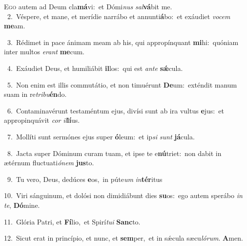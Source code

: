 \lettrine{\initial\textcolor{\initialcolor}{E}}{go} autem ad Deum cla\-\textbf{má}\-vi:~\star et Dómi\textit{nus} \textit{sal}\-\textbf{vá}bit me.\\
{\numbfont\textcolor{\numbcolor}{~2.}}~Véspere, et mane, et merídie narrábo et annunti\-\textbf{á}\-bo:~\star et exáudiet \textit{vo}\-\textit{cem} \textbf{me}\-am.\par
{\numbfont\textcolor{\numbcolor}{~3.}}~Rédimet in pace ánimam meam ab his, qui appropínquant \textbf{mi}\-hi:~\star quóniam inter multos \textit{e}\-\textit{rant} \textbf{me}\-cum.\par
{\numbfont\textcolor{\numbcolor}{~4.}}~Exáudiet Deus, et humiliábit \textbf{il}\-los:~\star qui est \textit{an}\-\textit{te} \textbf{sǽ}\-cula.\par
{\numbfont\textcolor{\numbcolor}{~5.}}~Non enim est illis commutátio, et non timuérunt \textbf{De}\-um:~\star exténdit manum suam in re\-\textit{tri}\-\textit{bu}\textbf{én}do.\par
{\numbfont\textcolor{\numbcolor}{~6.}}~Contaminavérunt testaméntum ejus, divísi sunt ab ira vultus \textbf{e}\-jus:~\star et appropinquávit \textit{cor} \textit{il}\-\textbf{lí}us.\par
{\numbfont\textcolor{\numbcolor}{~7.}}~Mollíti sunt sermónes ejus super \textbf{ó}\-leum:~\star et ip\textit{si} \textit{sunt} \textbf{já}\-cula.\par
{\numbfont\textcolor{\numbcolor}{~8.}}~Jacta super Dóminum curam tuam, et ipse te e\-\textbf{nú}\-triet:~\star non dabit in ætérnum fluctuati\-\textit{ó}\-\textit{nem} \textbf{jus}\-to.\par
{\numbfont\textcolor{\numbcolor}{~9.}}~Tu vero, Deus, dedúces \textbf{e}\-os,~\star in púte\textit{um} \textit{in}\-\textbf{tér}itus\par
{\numbfont\textcolor{\numbcolor}{10.}}~Viri sánguinum, et dolósi non dimidiábunt dies \textbf{su}\-os:~\star ego autem sperábo \textit{in} \textit{te}\-, \textbf{Dó}\-mine.\par
{\numbfont\textcolor{\numbcolor}{11.}}~Glória Patri, et \textbf{Fí}\-lio,~\star et Spirí\-\textit{tu}\-\textit{i} \textbf{Sanc}\-to.\par
{\numbfont\textcolor{\numbcolor}{12.}}~Sicut erat in princípio, et nunc, et \textbf{sem}\-per,~\star et in sǽcula sæcu\-\textit{ló}\-\textit{rum}. \textbf{A}\-men.\par
